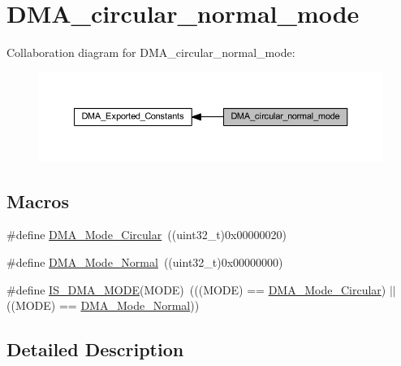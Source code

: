 \hypertarget{group___d_m_a__circular__normal__mode}{}\section{D\+M\+A\+\_\+circular\+\_\+normal\+\_\+mode}
\label{group___d_m_a__circular__normal__mode}
Collaboration diagram for D\+M\+A\+\_\+circular\+\_\+normal\+\_\+mode\+:
\nopagebreak
\begin{figure}[H]
\begin{center}
\leavevmode
\includegraphics[width=350pt]{group___d_m_a__circular__normal__mode}
\end{center}
\end{figure}
\subsection*{Macros}
\begin{DoxyCompactItemize}
\item 
\#define \hyperlink{group___d_m_a__circular__normal__mode_ga36327b14c302098fbc5823ac3f1ae020}{D\+M\+A\+\_\+\+Mode\+\_\+\+Circular}~((uint32\+\_\+t)0x00000020)
\item 
\#define \hyperlink{group___d_m_a__circular__normal__mode_ga36400f5b5095f1102ede4760d7a5959c}{D\+M\+A\+\_\+\+Mode\+\_\+\+Normal}~((uint32\+\_\+t)0x00000000)
\item 
\#define \hyperlink{group___d_m_a__circular__normal__mode_gad88ee5030574d6a573904378fb62c7ac}{I\+S\+\_\+\+D\+M\+A\+\_\+\+M\+O\+DE}(M\+O\+DE)~(((M\+O\+DE) == \hyperlink{group___d_m_a__circular__normal__mode_ga36327b14c302098fbc5823ac3f1ae020}{D\+M\+A\+\_\+\+Mode\+\_\+\+Circular}) $\vert$$\vert$ ((M\+O\+DE) == \hyperlink{group___d_m_a__circular__normal__mode_ga36400f5b5095f1102ede4760d7a5959c}{D\+M\+A\+\_\+\+Mode\+\_\+\+Normal}))
\end{DoxyCompactItemize}


\subsection{Detailed Description}


